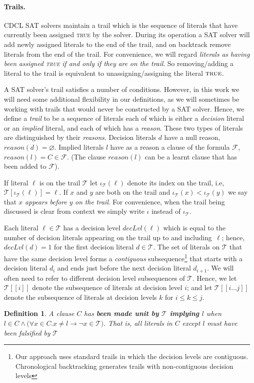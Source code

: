 \documentclass[runningheads]{llncs}
\newcommand{\sat}{SAT\xspace}
\newcommand{\trail}{\ensuremath{\mathcal{T}}}
\newcommand{\trailIdxT}[2]{\ensuremath{\iota_{#1}(#2)}}
\newcommand{\range}[2]{#1\ldots#2}
\newcommand{\dlevel}[1]{\ensuremath{\mathit{decLvl}(#1)}}
\newcommand{\true}{\textsc{true}\xspace}
\newcommand{\reason}[1]{\ensuremath{\mathit{reason}(#1)}}
\newcommand{\formula}{\ensuremath{\mathcal{F}}}
\renewcommand{\implies}{\rightarrow}
\newtheorem{defn}{Definition}
\begin{document}
\paragraph{Trails.}
CDCL \sat solvers maintain a trail which is the sequence of literals
that have currently been assigned \true by the solver. During its
operation a \sat solver will add newly assigned literals to the end of
the trail, and on backtrack remove literals from the end of the
trail. For convenience, we will regard \emph{literals as having been
  assigned \true if and only if they are on the trail}. So
removing/adding a literal to the trail is equivalent to
unassigning/assigning the literal $\true$.

A \sat solver's trail satisfies a number of conditions. However, in
this work we will need some additional flexibility in our definitions,
as we will sometimes be working with trails that would never be
constructed by a \sat solver. Hence, we define a \emph{trail} to be a
sequence of literals each of which is either a \emph{decision} literal
or an \emph{implied} literal, and each of which has a
\emph{reason}. These two types of literals are distinguished by their
\emph{reasons}. Decision literals $d$ have a null reason,
$\reason{d} = \varnothing$. Implied literals $l$ have as a reason a
clause of the formula $\formula$, $\reason{l} =
C\in\formula$. (The clause $\reason{l}$ can be a learnt clause that has been
added to $\formula$).

If literal $\ell$ is on the trail $\trail$ let
$\trailIdxT{\trail}{\ell}$ denote its index on the trail, i.e,
$\trail[\trailIdxT{\trail}{\ell}] = \ell$. If $x$ and $y$ are both on
the trail and $\trailIdxT{\trail}{x} < \trailIdxT{\trail}{y}$ we say
that \textit{$x$ appears before $y$ on the trail}. For convenience,
when the trail being discussed is clear from context we simply write
$\iota$ instead of $\iota_{\trail}$.

Each literal $\ell\in\trail$ has a decision level $\dlevel{\ell}$
which is equal to the number of decision literals appearing on the trail
up to and including $\ell$; hence, $\dlevel{d}=1$ for the first
decision literal $d\in\trail$. The set of literals on $\trail$ that
have the same decision level forms a \emph{contiguous}
subsequence\footnote{Our approach uses standard trails in which the
  decision levels are contiguous. Chronological backtracking
  \cite{DBLP:conf/lpar/JiangZ13,DBLP:conf/sat/NadelR18,DBLP:conf/sat/MohleB19}
  generates trails with non-contiguous decision levels} that starts
with a decision literal $d_i$ and ends just before the next decision
literal $d_{i+1}$. We will often need to refer to different decision
level subsequences of $\trail$. Hence, we let $\trail[[i]]$ denote the
subsequence of literals at decision level $i$; and let
$\trail[[\range{i}{j}]]$ denote the subsequence of literals at
decision levels $k$ for $i\leq k\leq j$. 
\begin{defn}
    A clause $C$ has \textbf{been made unit by $\trail$ implying $l$}
    when
    $l\in C \land \bigl(\forall x\in C. x\neq l \implies \lnot x \in
    \trail\bigr)$. That is, all literals in $C$ except $l$ must have
    been falsified by $\trail$
\end{defn}
\end{document}

